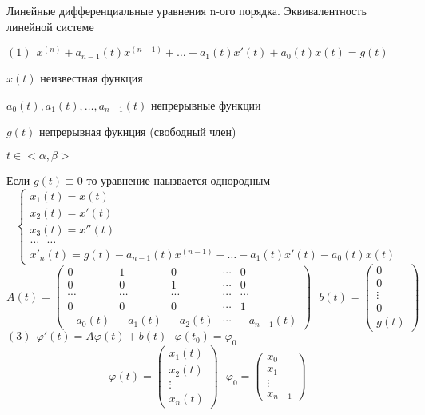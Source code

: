 \begin{title}[\Large]
  Линейные дифференциальные уравнения n-ого порядка. Эквивалентность линейной
  системе
\end{title}

\begin{define}
  $(1) ~~ x^{(n)} + a_{n-1}(t)x^{(n-1)} + \ldots + a_1(t) x'(t) + a_0(t)x(t)
  = g(t)$

  $x(t)$ неизвестная функция

  $a_0(t), a_1(t), \ldots, a_{n-1}(t)$ непрерывные функции

  $g(t)$ непрерывная фукнция (свободный член)

  $t \in <\alpha, \beta>$

  Если $g(t) \equiv 0$ то уравнение наызвается однородным
  $$
  \left\{
  \begin{array}{l}
    x_1(t) = x(t) \\
    x_2(t) = x'(t) \\
    x_3(t) = x''(t) \\
    \ldots ~~~ \ldots \\
    x'_n(t) = g(t) - a_{n-1}(t)x^{(n-1)} - \ldots - a_1(t) x'(t) - a_0(t)x(t)
  \end{array}
  \right.
  $$
  $$
  A(t) =
  \left(
  \begin{array}{ccccc}
    0 & 1 & 0 & \cdots & 0 \\
    0 & 0 & 1 & \cdots & 0 \\
    \cdots & \cdots & \cdots & \cdots & \cdots  \\
    0 & 0 & 0 & \cdots & 1 \\
    -a_0(t) & -a_1(t) & -a_2(t) & \cdots & -a_{n-1}(t)
  \end{array}
  \right)
  ~~~
  b(t) =
  \left(
  \begin{array}{c}
    0 \\
    0 \\
    \vdots \\
    0 \\
    g(t)
  \end{array}
  \right)
  $$
  $(3) ~~ \varphi'(t) = A\varphi(t) + b(t) ~~~ \varphi(t_0) = \varphi_0$
  $$
  \varphi(t) =
  \left(
  \begin{array}{c}
    x_1(t) \\
    x_2(t) \\
    \vdots \\
    x_n(t)
  \end{array}
  \right)
  ~~~
  \varphi_0 =
  \left(
  \begin{array}{c}
    x_0 \\
    x_1 \\
    \vdots \\
    x_{n-1}
  \end{array}
  \right)
  $$
\end{define}

